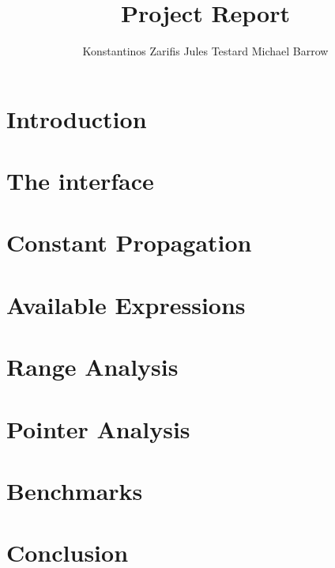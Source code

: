 \documentclass[11pt,twocolumn]{article}
\begin{document}
\title{Project Report}
\author{Konstantinos Zarifis \quad Jules Testard \quad Michael Barrow}
\maketitle

\section{Introduction}



\section{The interface}



\section{Constant Propagation}



\section{Available Expressions}



\section{Range Analysis}



\section{Pointer Analysis}



\section{Benchmarks}



\section{Conclusion}


\end{document}
